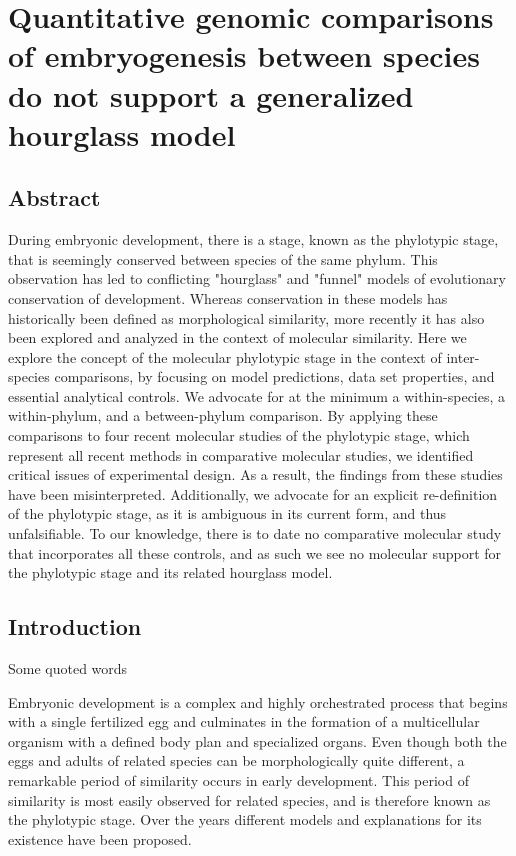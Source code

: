 \chapter{Quantitative genomic comparisons of embryogenesis between species do not support a generalized hourglass model}\thumbforchapter
{}
\newpage

\section{Abstract}

During embryonic development, there is a stage, known as the phylotypic stage, that is seemingly conserved between species of the same phylum. This observation has led to conflicting "hourglass" and "funnel" models of evolutionary conservation of development. Whereas conservation in these models has historically been defined as morphological similarity, more recently it has also been explored and analyzed in the context of molecular similarity. 
Here we explore the concept of the molecular phylotypic stage in the context of inter-species comparisons, by focusing on model predictions, data set properties, and essential analytical controls. We advocate for at the minimum a within-species, a within-phylum, and a between-phylum comparison. 
By applying these comparisons to four recent molecular studies of the phylotypic stage, which represent all recent methods in comparative molecular studies, we identified critical issues of experimental design. As a result, the findings from these studies have been misinterpreted. Additionally, we advocate for an explicit re-definition of the phylotypic stage, as it is ambiguous in its current form, and thus unfalsifiable. To our knowledge, there is to date no comparative molecular study that incorporates all these controls, and as such we see no molecular support for the phylotypic stage and its related hourglass model.

\section{Introduction}

\begin{shadequote}
Some quoted words
\end{shadequote}

Embryonic development is a complex and highly orchestrated process that begins with a single fertilized egg and culminates in the formation of a multicellular organism with a defined body plan and specialized organs. Even though both the eggs and adults of related species can be morphologically quite different, a remarkable period of similarity occurs in early development. This period of similarity is most easily observed for related species, and is therefore known as the phylotypic stage. Over the years different models and explanations for its existence have been proposed\cite{Kalinka2012,Irie2014,Drost2017}.  

